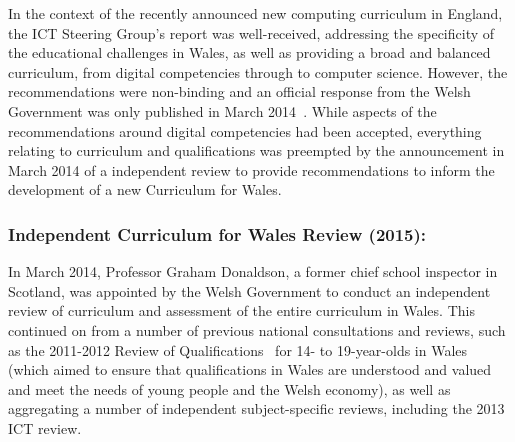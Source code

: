 \documentclass{llncs}
\begin{document}

In the context of the recently announced new computing curriculum in
England, the ICT Steering Group's report was well-received, addressing
the specificity of the educational challenges in Wales, as well as
providing a broad and balanced curriculum, from digital competencies
through to computer science. However, the recommendations were
non-binding and an official response from the Welsh Government was
only published in March 2014~\cite{wgictresponse:2014}. While aspects
of the recommendations around digital competencies had been accepted,
everything relating to curriculum and qualifications was preempted by
the announcement in March 2014 of a independent review to provide
recommendations to inform the development of a new Curriculum for
Wales.


\subsubsection*{Independent Curriculum for Wales Review (2015):}

In March 2014, Professor Graham Donaldson, a former chief school
inspector in Scotland, was appointed by the Welsh Government to
conduct an independent review of curriculum and assessment %
of the entire curriculum in Wales. This continued on
from a number of previous national consultations and reviews, such as
the 2011-2012 Review of Qualifications~\cite{wgrev14-19:2014}
for 14- to 19-year-olds in Wales (which aimed to ensure that qualifications
in Wales are understood and valued and meet the needs of young people and
the Welsh economy), as well as aggregating a number of independent
subject-specific reviews, including the 2013 ICT review.
\end{document}
